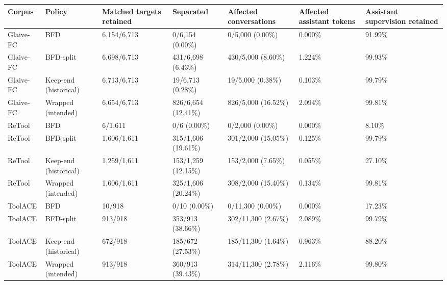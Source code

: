 \begin{tabular}{lllllll}
\toprule
Corpus & Policy & Matched targets retained & Separated & Affected conversations & Affected assistant tokens & Assistant supervision retained \\
\midrule
Glaive-FC & BFD & 6,154/6,713 & 0/6,154 (0.00\%) & 0/5,000 (0.00\%) & 0.000\% & 91.99\% \\
Glaive-FC & BFD-split & 6,698/6,713 & 431/6,698 (6.43\%) & 430/5,000 (8.60\%) & 1.224\% & 99.93\% \\
Glaive-FC & Keep-end (historical) & 6,713/6,713 & 19/6,713 (0.28\%) & 19/5,000 (0.38\%) & 0.103\% & 99.79\% \\
Glaive-FC & Wrapped (intended) & 6,654/6,713 & 826/6,654 (12.41\%) & 826/5,000 (16.52\%) & 2.094\% & 99.81\% \\
ReTool & BFD & 6/1,611 & 0/6 (0.00\%) & 0/2,000 (0.00\%) & 0.000\% & 8.10\% \\
ReTool & BFD-split & 1,606/1,611 & 315/1,606 (19.61\%) & 301/2,000 (15.05\%) & 0.125\% & 99.79\% \\
ReTool & Keep-end (historical) & 1,259/1,611 & 153/1,259 (12.15\%) & 153/2,000 (7.65\%) & 0.055\% & 27.10\% \\
ReTool & Wrapped (intended) & 1,606/1,611 & 325/1,606 (20.24\%) & 308/2,000 (15.40\%) & 0.134\% & 99.81\% \\
ToolACE & BFD & 10/918 & 0/10 (0.00\%) & 0/11,300 (0.00\%) & 0.000\% & 17.23\% \\
ToolACE & BFD-split & 913/918 & 353/913 (38.66\%) & 302/11,300 (2.67\%) & 2.089\% & 99.79\% \\
ToolACE & Keep-end (historical) & 672/918 & 185/672 (27.53\%) & 185/11,300 (1.64\%) & 0.963\% & 88.20\% \\
ToolACE & Wrapped (intended) & 913/918 & 360/913 (39.43\%) & 314/11,300 (2.78\%) & 2.116\% & 99.80\% \\
\bottomrule
\end{tabular}